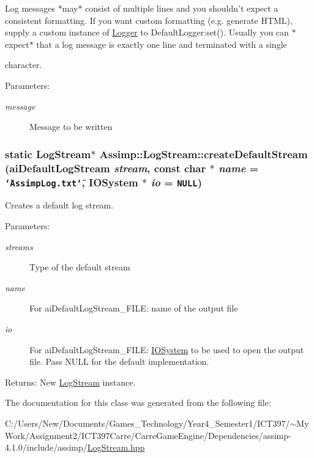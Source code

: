 Log messages $\ast$may$\ast$ consist of multiple lines and you shouldn't expect a consistent formatting. If you want custom formatting (e.g. generate HTML), supply a custom instance of \hyperlink{class_assimp_1_1_logger}{Logger} to DefaultLogger:set(). Usually you can $\ast$expect$\ast$ that a log message is exactly one line and terminated with a single \par
 character. \begin{Desc}
\item[Parameters:]
\begin{description}
\item[{\em message}]Message to be written \end{description}
\end{Desc}
\hypertarget{class_assimp_1_1_log_stream_6b358a4a79b2e9ba2025e10d3e9405e3}{
\subsubsection[createDefaultStream]{\setlength{\rightskip}{0pt plus 5cm}static {\bf LogStream}$\ast$ Assimp::LogStream::createDefaultStream ({\bf aiDefaultLogStream} {\em stream}, \/  const char $\ast$ {\em name} = {\tt \char`\"{}AssimpLog.txt\char`\"{}}, \/  {\bf IOSystem} $\ast$ {\em io} = {\tt NULL})}}
\label{class_assimp_1_1_log_stream_6b358a4a79b2e9ba2025e10d3e9405e3}


Creates a default log stream. 

\begin{Desc}
\item[Parameters:]
\begin{description}
\item[{\em streams}]Type of the default stream \item[{\em name}]For aiDefaultLogStream\_\-FILE: name of the output file \item[{\em io}]For aiDefaultLogStream\_\-FILE: \hyperlink{class_assimp_1_1_i_o_system}{IOSystem} to be used to open the output file. Pass NULL for the default implementation. \end{description}
\end{Desc}
\begin{Desc}
\item[Returns:]New \hyperlink{class_assimp_1_1_log_stream}{LogStream} instance. \end{Desc}


The documentation for this class was generated from the following file:\begin{CompactItemize}
\item 
C:/Users/New/Documents/Games\_\-Technology/Year4\_\-Semester1/ICT397/$\sim$My Work/Assignment2/ICT397Carre/CarreGameEngine/Dependencies/assimp-4.1.0/include/assimp/\hyperlink{_log_stream_8hpp}{LogStream.hpp}\end{CompactItemize}
